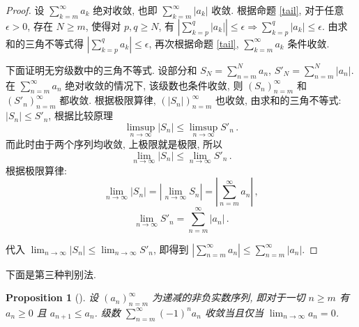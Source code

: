 \documentclass[UTF8]{ctexart}
\theoremstyle{mystyle}
\newtheorem{proposition}{Proposition}[section]
\theoremstyle{myremark}
\theoremstyle{plain}
\begin{document}
\begin{proof}
    设 $ \displaystyle \sum_{k = m}^\infty a_k $ 绝对收敛, 也即 $ \displaystyle \sum_{k = m}^\infty |a_k| $ 收敛. 根据命题 \ref{tail}, 对于任意 $ \epsilon > 0 $, 存在 $ N \geqslant m $, 使得对 $ p, q \geqslant N $, 有 $ \displaystyle \left| \sum_{k = p}^{q} |a_k| \right| \leqslant \epsilon \Longrightarrow \sum_{k = p}^q |a_k| \leqslant \epsilon $. 由求和的三角不等式得 $ \displaystyle \left| \sum_{k = p}^q a_k \right| \leqslant \epsilon $, 再次根据命题 \ref{tail}, $ \displaystyle \sum_{k = m}^\infty a_k $ 条件收敛.

    下面证明无穷级数中的三角不等式. 设部分和 $ S_N = \displaystyle \sum_{n = m}^N a_n $, $ S'_N = \displaystyle \sum_{n = m}^N |a_n| $. 在 $ \displaystyle \sum_{n = m}^\infty a_n $ 绝对收敛的情况下, 该级数也条件收敛, 则 $ (S_n)_{n = m}^\infty $ 和 $ (S'_n)_{n = m}^\infty $ 都收敛. 根据极限算律, $ (|S_n|)_{n = m}^\infty $ 也收敛, 由求和的三角不等式: $ |S_n| \leqslant S'_n $, 根据比较原理 \[ \limsup_{n \to \infty} |S_n| \leqslant \limsup_{n \to \infty} S'_n \,. \] 而此时由于两个序列均收敛, 上极限就是极限, 所以 \[ \lim_{n \to \infty} |S_n| \leqslant \lim_{n \to \infty} S'_n \,.\] 根据极限算律: \[ \lim_{n \to \infty} |S_n| = \left| \lim_{n \to \infty} S_n \right| = \left| \sum_{n = m}^\infty a_n \right| \,,\] \[ \lim_{n \to \infty} S'_n = \sum_{n = m}^\infty |a_n| \,.\]
    
    代入 $ \displaystyle \lim_{n \to \infty} |S_n| \leqslant \lim_{n \to \infty} S'_n $, 即得到 $ \displaystyle \left| \sum_{n = m}^\infty a_n \right| \leqslant \sum_{n = m}^\infty |a_n| $.
\end{proof}

下面是第三种判别法.

\begin{proposition}[]
    设 $ (a_n)_{n = m}^\infty $ 为递减的非负实数序列, 即对于一切 $ n \geqslant m $ 有 $ a_n \geqslant 0 $ 且 $ a_{n + 1} \leqslant a_n $. 级数 $ \displaystyle \sum_{n = m}^\infty (-1)^n a_n $ 收敛当且仅当 $ \displaystyle \lim_{n \to \infty} a_n = 0 $.
\end{proposition}
\end{document}
